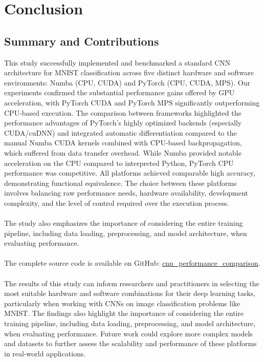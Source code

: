 \documentclass[conference]{IEEEtran} %
\begin{document}
\section{Conclusion}
\subsection{Summary and Contributions}
\label{sec:summary}
This study successfully implemented and benchmarked a standard CNN architecture for MNIST classification across five distinct hardware and software environments: Numba (CPU, CUDA) and PyTorch (CPU, CUDA, MPS). Our experiments confirmed the substantial performance gains offered by GPU acceleration, with PyTorch CUDA and PyTorch MPS significantly outperforming CPU-based execution. The comparison between frameworks highlighted the performance advantages of PyTorch's highly optimized backends (especially CUDA/cuDNN) and integrated automatic differentiation compared to the manual Numba CUDA kernels combined with CPU-based backpropagation, which suffered from data transfer overhead. While Numba provided notable acceleration on the CPU compared to interpreted Python, PyTorch CPU performance was competitive. All platforms achieved comparable high accuracy, demonstrating functional equivalence. The choice between these platforms involves balancing raw performance needs, hardware availability, development complexity, and the level of control required over the execution process.
\\
\\
The study also emphasizes the importance of considering the entire training pipeline, including data loading, preprocessing, and model architecture, when evaluating performance. 
\\
\\
\label{sec:github}
The complete source code is available on GitHub: 
\href{https://github.com/geetikak13/cnn_performance_comparison}{\color{blue}cnn\_performance\_comparison}.
\\
\\
The results of this study can inform researchers and practitioners in selecting the most suitable hardware and software combinations for their deep learning tasks, particularly when working with CNNs on image classification problems like MNIST. The findings also highlight the importance of considering the entire training pipeline, including data loading, preprocessing, and model architecture, when evaluating performance. Future work could explore more complex models and datasets to further assess the scalability and performance of these platforms in real-world applications.
\end{document}

